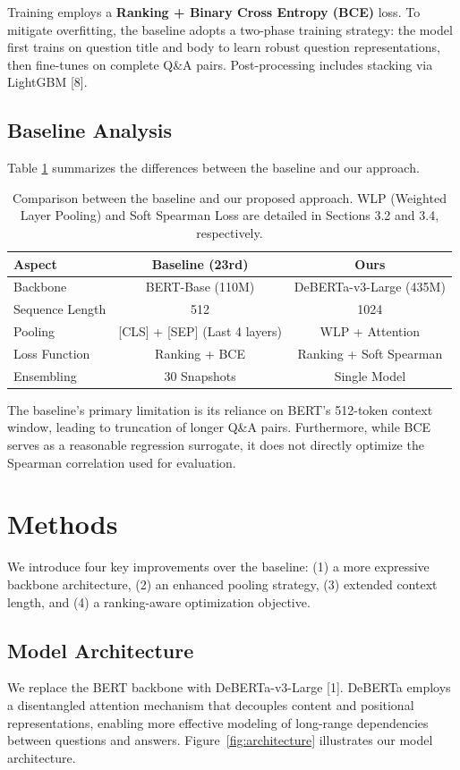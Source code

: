 \documentclass{article}
\begin{document}
Training employs a \textbf{Ranking + Binary Cross Entropy (BCE)} loss. To mitigate overfitting, the baseline adopts a two-phase training strategy: the model first trains on question title and body to learn robust question representations, then fine-tunes on complete Q\&A pairs. Post-processing includes stacking via LightGBM [8].

\subsection{Baseline Analysis}
Table \ref{tab:comparison} summarizes the differences between the baseline and our approach.

\begin{table}[h]
  \caption{Comparison between the baseline and our proposed approach. WLP (Weighted Layer Pooling) and Soft Spearman Loss are detailed in Sections 3.2 and 3.4, respectively.}
  \label{tab:comparison}
  \centering
  \begin{tabular}{lcc}
    \toprule
    \textbf{Aspect} & \textbf{Baseline (23rd)} & \textbf{Ours} \\
    \midrule
    Backbone & BERT-Base (110M) & DeBERTa-v3-Large (435M) \\
    Sequence Length & 512 & 1024 \\
    Pooling & [CLS] + [SEP] (Last 4 layers) & WLP + Attention \\
    Loss Function & Ranking + BCE & Ranking + Soft Spearman \\
    Ensembling & 30 Snapshots & Single Model \\
    \bottomrule
  \end{tabular}
\end{table}

The baseline's primary limitation is its reliance on BERT's 512-token context window, leading to truncation of longer Q\&A pairs. Furthermore, while BCE serves as a reasonable regression surrogate, it does not directly optimize the Spearman correlation used for evaluation.

\section{Methods}
We introduce four key improvements over the baseline: (1) a more expressive backbone architecture, (2) an enhanced pooling strategy, (3) extended context length, and (4) a ranking-aware optimization objective.

\subsection{Model Architecture}
We replace the BERT backbone with DeBERTa-v3-Large [1]. DeBERTa employs a disentangled attention mechanism that decouples content and positional representations, enabling more effective modeling of long-range dependencies between questions and answers.
Figure~\ref{fig:architecture} illustrates our model architecture.
\end{document}
